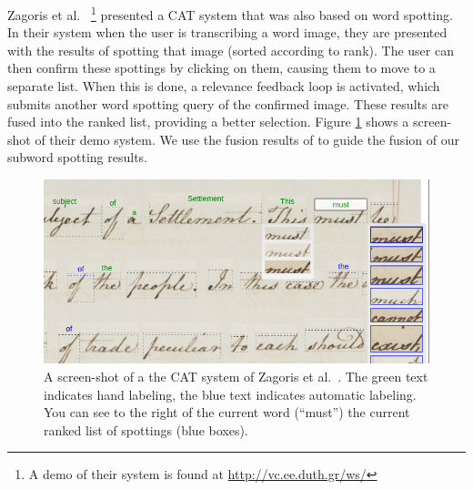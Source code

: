 \documentclass[ms,electronic,twosidetoc,letterpaper,chaptercenter,parttop,lol,lof,lot]{byumsphd}
\begin{document}
Zagoris et al.~\cite{Zagoris2015} \footnote{A demo of their system is found at \url{http://vc.ee.duth.gr/ws/}} presented a CAT system that was also based on word spotting. In their system when the user is transcribing a word image, they are presented with the results of spotting that image (sorted according to rank). The user can then confirm these spottings by clicking on them, causing them to move to a separate list. When this is done, a relevance feedback loop is activated, which submits another word spotting query of the confirmed image. These results are fused into the ranked list, providing a better selection. Figure \ref{fig:zagoris} shows a screen-shot of their demo system.
We use the fusion results of \cite{Zagoris2015} to guide the fusion of our subword spotting results.

\begin{figure}
    \centering
    \includegraphics[width=.9\textwidth]{zagoris}
    \caption{A screen-shot of a the CAT system of Zagoris et al.~\cite{Zagoris2015}. The green text indicates hand labeling, the blue text indicates automatic labeling. You can see to the right of the current word (``must'') the current ranked list of spottings (blue boxes).}
    \label{fig:zagoris}
\end{figure}
\end{document}
